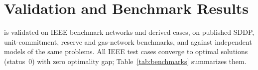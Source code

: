 
\section{Validation and Benchmark Results}
\label{sec:validation}

\gtopt{} is validated on IEEE benchmark networks and derived cases,
on published SDDP, unit-commitment, reserve and gas-network benchmarks,
and against independent models of the same problems.  All IEEE test
cases converge to optimal solutions (status~0) with zero optimality
gap; Table~\ref{tab:benchmarks} summarizes them.

